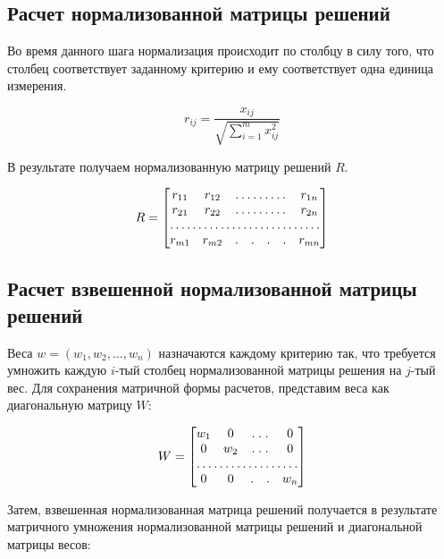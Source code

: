 \documentclass{article}
\begin{document}
    \subsection{Расчет нормализованной матрицы решений}
        Во время данного шага нормализация происходит по столбцу в силу того, что столбец
        соответствует заданному критерию и ему соответствует одна единица измерения.

        \begin{equation}
            \label{eq:norm_decision_matrix}
            r_{ij} = \frac{x_{ij}}{\sqrt{\sum_{i=1}^{m}x_{ij}^2}}
        \end{equation}

        В результате получаем нормализованную матрицу решений \(R\).

        \[
            R = \begin{bmatrix}
             r_{11}&  r_{12}& \hdotsfor{4} & r_{1n}\\
             r_{21}&  r_{22}& \hdotsfor{4} & r_{2n}\\
            \hdotsfor{7}\\
            r_{m1}&  r_{m2}& . & . & . & . & r_{mn}\\
            \end{bmatrix}
        \]

    \subsection{Расчет взвешенной нормализованной матрицы решений}
        Веса \(w=(w_1,w_2,\dots,w_n)\) назначаются каждому критерию так, что требуется умножить
        каждую \(i\)-тый столбец нормализованной матрицы решения на \(j\)-тый вес.
        Для сохранения матричной формы расчетов, представим веса как диагональную матрицу \(W\):

        \[
            W = \begin{bmatrix}
                w_{1}&  0 & \hdotsfor{2} & 0\\
                0 &  w_{2}& \hdotsfor{2} & 0\\
                \hdotsfor{5}\\
                0 &  0 & . & . & w_{n}\\
            \end{bmatrix}
        \]

        Затем, взвешенная нормализованная матрица решений получается в результате матричного
        умножения нормализованной матрицы решений и диагональной матрицы весов:
\end{document}
